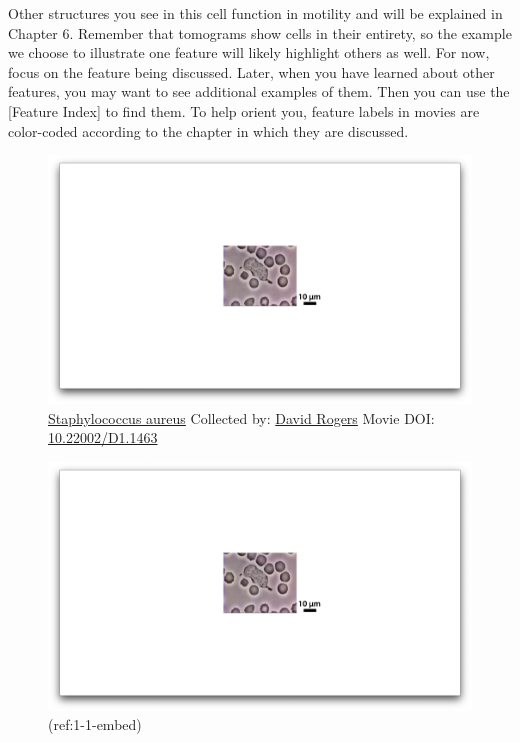 \documentclass[]{tufte-book}
\begin{document}
Other structures you see in this cell function in motility and will be
explained in Chapter 6. Remember that tomograms show cells in their
entirety, so the example we choose to illustrate one feature will likely
highlight others as well. For now, focus on the feature being discussed.
Later, when you have learned about other features, you may want to see
additional examples of them. Then you can use the {[}Feature Index{]} to
find them. To help orient you, feature labels in movies are color-coded
according to the chapter in which they are discussed.





\begin{figure}
\includegraphics{movie_stills/1_1} \caption[\protect\hyperlink{tree}{Staphylococcus aureus} Collected by:
\protect\hyperlink{david_rogers}{David Rogers} Movie DOI:
\href{https://doi.org/10.22002/D1.1463}{10.22002/D1.1463}]{\protect\hyperlink{tree}{Staphylococcus aureus} Collected by:
\protect\hyperlink{david_rogers}{David Rogers} Movie DOI:
\href{https://doi.org/10.22002/D1.1463}{10.22002/D1.1463}}\label{fig:1-1}
\end{figure}

\begin{figure}
\includegraphics{movie_stills/1_1} \caption[(ref:1-1-embed)]{(ref:1-1-embed)}\label{fig:1-1-embed}
\end{figure}
\end{document}
